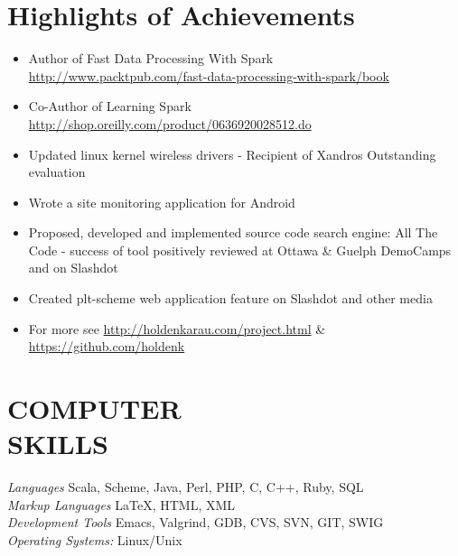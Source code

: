 \documentclass[10pt,line,margin=0.1]{newsres}
\begin{document}
\address{3407 24th St, Apt \#2, San Francisco, CA, USA}
\address{E-mail: holden@pigscanfly.ca, Cell: (425) 233-8271}
 
\begin{resume}
  
 \section{Highlights of Achievements}
\begin{itemize}  \itemsep -2pt %
\item{Author of  Fast Data Processing With Spark \\ \url{http://www.packtpub.com/fast-data-processing-with-spark/book}}
\item{Co-Author of Learning Spark \\ \url{http://shop.oreilly.com/product/0636920028512.do}}
\item{Updated linux kernel wireless drivers - Recipient of Xandros Outstanding evaluation}
\item{Wrote a site monitoring application for Android}
\item{Proposed, developed and implemented source code search engine: All The Code - success of tool positively reviewed at Ottawa \& Guelph DemoCamps and on Slashdot}
\item{Created plt-scheme web application feature on Slashdot and other media}
\item{For more see \url{http://holdenkarau.com/project.html} \& \url{https://github.com/holdenk}}
\end{itemize}
\section{COMPUTER \\ SKILLS} {\sl Languages} Scala, Scheme, Java, Perl, PHP, C, C++, Ruby, SQL \\ %
                {\sl Markup Languages} \LaTeX , HTML, XML \\
                {\sl Development Tools} Emacs, Valgrind, GDB, CVS, SVN, GIT, SWIG \\
                {\sl Operating Systems:}  Linux/Unix \\
 

\end{resume}
\end{document}
